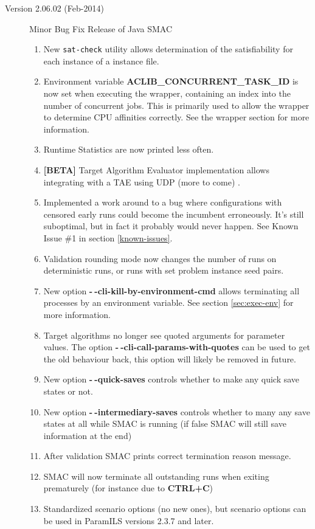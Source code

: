 \documentclass[11pt,letterpaper,oneside]{article}
\begin{document}
\begin{description}
          \item[Version 2.06.02 (Feb-2014)] Minor Bug Fix Release of Java SMAC
          	\begin{enumerate}
          	\item New \texttt{sat-check} utility allows determination of the satisfiability for each instance of a instance file.
          		\item Environment variable \textbf{ACLIB\_CONCURRENT\_TASK\_ID} is now set when executing the wrapper, containing an index into the number of concurrent jobs. This is primarily used to allow the wrapper to determine CPU affinities correctly. See the wrapper section for more information.
          		\item Runtime Statistics are now printed less often.
          		\item \textbf{[BETA]} Target Algorithm Evaluator implementation allows integrating with a TAE using UDP (more to come) .
          		\item Implemented a work around to a bug where configurations with censored early runs could become the incumbent erroneously. It's still suboptimal, but in fact it probably would never happen. See Known Issue \#1 in section \ref{known-issues}.
          		\item Validation rounding mode now changes the number of runs on deterministic runs, or runs with set problem instance seed pairs.
          		\item New option \textbf{-$~\!$-cli-kill-by-environment-cmd} allows terminating all processes by an environment variable. See section \ref{sec:exec-env} for more information.
          		\item Target algorithms no longer see quoted arguments for parameter values. The option \textbf{-$~\!$-cli-call-params-with-quotes} can be used to get the old behaviour back, this option will likely be removed in future.
          		\item New option \textbf{-$~\!$-quick-saves} controls whether to make any quick save states or not.
          		\item New option \textbf{-$~\!$-intermediary-saves} controls whether to many any save states at all while SMAC is running (if false SMAC will still save information at the end)
          		\item After validation SMAC prints correct termination reason message.
          		\item SMAC will now terminate all outstanding runs when exiting prematurely (for instance due to \textbf{CTRL+C})
          		\item Standardized scenario options (no new ones), but scenario options can be used in ParamILS versions 2.3.7 and later.
          		

\end{enumerate}
\end{description}
\end{document}
